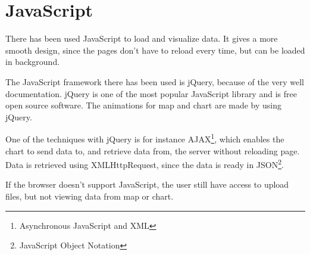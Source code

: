 \chapter{JavaScript}
There has been used JavaScript to load and visualize data. It gives a more smooth design, since the pages don't have to reload every time, but can be loaded in background.

The JavaScript framework there has been used is jQuery, because of the very well documentation. jQuery is one of the most popular JavaScript library and is free open source software. The animations for map and chart are made by using jQuery.
 
One of the techniques with jQuery is for instance AJAX\footnote{Asynchronous JavaScript and XML}, which enables the chart to send data to, and retrieve data from, the server without reloading page. Data is retrieved using XMLHttpRequest, since the data is ready in JSON\footnote{JavaScript Object Notation}.

If the browser doesn't support JavaScript, the user still have access to upload files, but not viewing data from map or chart.